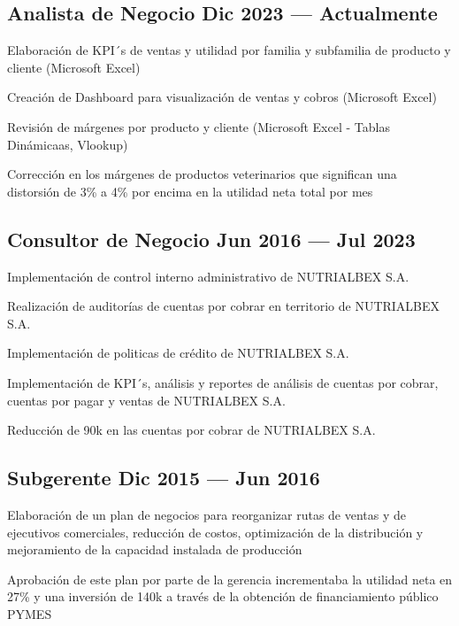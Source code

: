 \subsection{\texorpdfstring{Analista de Negocio \hfill Dic 2023 --- Actualmente}{Analista de Negocio Dic 2023 --- Actualmente}}
\begin{zitemize}
\item Elaboración de KPI´s de ventas y utilidad por familia y subfamilia de producto y cliente (Microsoft Excel)
\item Creación de Dashboard para visualización de ventas y cobros (Microsoft Excel) 
\item Revisión de márgenes por producto y cliente (Microsoft Excel - Tablas Dinámicaas, Vlookup)
\item Corrección en los márgenes de productos veterinarios que significan una distorsión de 3\% a 4\% por encima en la utilidad neta total por mes  
\end{zitemize}

\subsection{\texorpdfstring{Consultor de Negocio \hfill Jun 2016 --- Jul 2023}{Consultor de Negocio Jul 2016 --- Jun 2023}}
\begin{zitemize}
\item Implementación de control interno administrativo de NUTRIALBEX S.A.
\item Realización de auditorías de cuentas por cobrar en territorio de NUTRIALBEX S.A.
\item Implementación de politicas de crédito de NUTRIALBEX S.A.
\item Implementación de KPI´s, análisis  y reportes de análisis de cuentas por cobrar, cuentas por pagar y ventas de NUTRIALBEX S.A.
\item Reducción de 90k en las cuentas por cobrar de NUTRIALBEX S.A.
\end{zitemize}

\subsection{\texorpdfstring{Subgerente \hfill Dic 2015 --- Jun 2016}{Subgerente Dic 2015 --- Jun 2016}}
\begin{zitemize}
\item Elaboración de un plan de negocios para reorganizar rutas de ventas y de ejecutivos comerciales, reducción de costos, optimización de la distribución y mejoramiento de la capacidad instalada de producción
\item Aprobación de este plan por parte de la gerencia incrementaba la utilidad neta en 27\% y una inversión de 140k a través de la obtención de financiamiento público PYMES
\end{zitemize}

